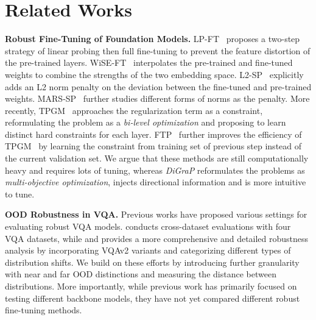 \section{Related Works}

\noindent \textbf{Robust Fine-Tuning of Foundation Models.} LP-FT~\citep{kumar_fine-tuning_2022} proposes a two-step strategy of linear probing then full fine-tuning to prevent the feature distortion of the pre-trained layers. WiSE-FT~\citep{wortsman_robust_2022} interpolates the pre-trained and fine-tuned weights to combine the strengths of the two embedding space. L2-SP~\citep{li_explicit_2018} explicitly adds an L2 norm penalty on the deviation between the fine-tuned and pre-trained weights. MARS-SP~\citep{gouk_distance-based_2021} further studies different forms of norms as the penalty. More recently, TPGM~\citep{tian_trainable_2023} approaches the regularization term as a constraint, reformulating the problem as a \textit{bi-level optimization} and proposing to learn distinct hard constraints for each layer. FTP~\citep{tian_fast_2023} further improves the efficiency of TPGM~\citep{tian_trainable_2023} by learning the constraint from training set of previous step instead of the current validation set. We argue that these methods are still computationally heavy and requires lots of tuning, whereas \emph{DiGraP} reformulates the problems as \textit{multi-objective optimization}, injects directional information and is more intuitive to tune.

\noindent \textbf{OOD Robustness in VQA.} Previous works have proposed various settings for evaluating robust VQA models. \citet{agrawal_reassessing_2023} conducts cross-dataset evaluations with four VQA datasets, while \citet{ma_robust_2024} and \citet{li_closer_2021} provides a more comprehensive and detailed robustness analysis by incorporating VQAv2 variants and categorizing different types of distribution shifts. We build on these efforts by introducing further granularity with near and far OOD distinctions and measuring the distance between distributions. More importantly, while previous work has primarily focused on testing different backbone models, they have not yet compared different robust fine-tuning methods.

